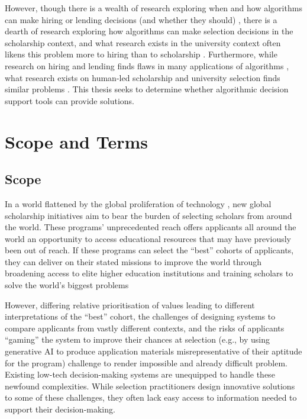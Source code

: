 However, though there is a wealth of research exploring when and how algorithms can make hiring or lending decisions (and whether they should) \cite{schmidt1998validity,schumann2017diverse,raghavan2020mitigating,horodyski_applicants_2023,Leung_Zhang_Jibuti_Zhao_Klein_Pierce_Robert_Zhu_2020}, there is a dearth of research exploring how algorithms can make selection decisions in the scholarship context, and what research exists in the university context often likens this problem more to hiring than to scholarship \cite{schumann2017diverse}. Furthermore, while research on hiring and lending finds flaws in many applications of algorithms \cite{raghavan2020mitigating,horodyski_applicants_2023}, what research exists on human-led scholarship and university selection finds similar problems \cite{Peng_Nushi_Kıcıman_Inkpen_Suri_Kamar_2019}. This thesis seeks to determine whether algorithmic decision support tools can provide solutions.

\section{Scope and Terms}
\subsection{Scope}
In a world flattened by the global proliferation of technology \cite{Friedman_2005}, new global scholarship initiatives aim to bear the burden of selecting scholars from around the world. These programs' unprecedented reach offers applicants all around the world an opportunity to access educational resources that may have previously been out of reach. If these programs can select the ``best'' cohorts of applicants, they can deliver on their stated missions to improve the world through broadening access to elite higher education institutions and training scholars to solve the world's biggest problems

However, differing relative prioritisation of values leading to different interpretations of the ``best'' cohort, the challenges of designing systems to compare applicants from vastly different contexts, and the risks of applicants ``gaming'' the system to improve their chances at selection (e.g., by using generative AI to produce application materials misrepresentative of their aptitude for the program) challenge to render impossible and already difficult problem. Existing low-tech decision-making systems are unequipped to handle these newfound complexities. While selection practitioners design innovative solutions to some of these challenges, they often lack easy access to information needed to support their decision-making.

